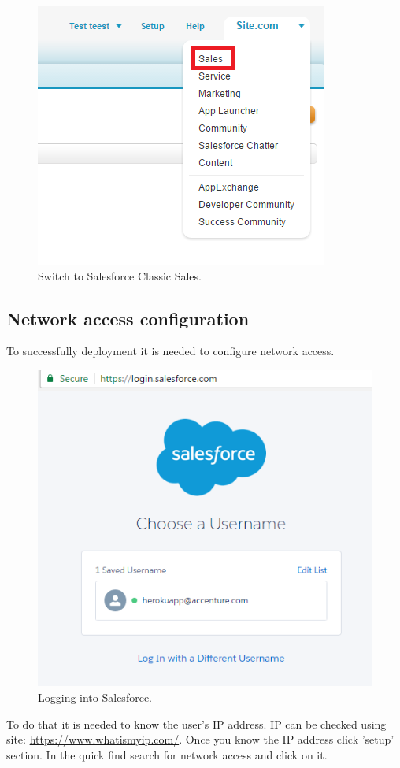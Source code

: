 \documentclass[12pt,a4paper]{article}
\begin{document}
\begin{figure}[H]
	\centering
	\includegraphics{images/change3.PNG}
	\caption{Switch to Salesforce Classic Sales.}
	\label{fig:logr}
\end{figure}
\subsection{Network access configuration}
To successfully deployment it is needed to configure network access.
\begin{figure}[H]
	\centering
	\includegraphics{images/connect5.PNG}
	\caption{Logging into Salesforce.}
	\label{fig:log}
\end{figure}
To do that it is needed to know the user’s IP address. IP can be checked using site: \url{https://www.whatismyip.com/}.
Once you know the IP address click 'setup' section. In the quick find search for network access and click on it.  
\end{document}

